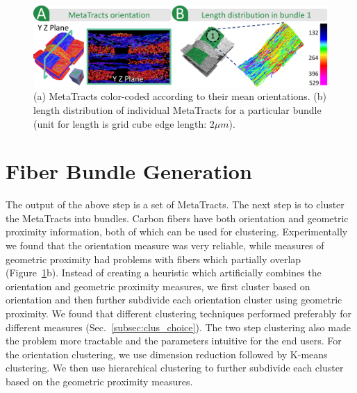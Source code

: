 

\begin{figure}[tb]
\centering
	\includegraphics[width=\linewidth]{images_pvis/figure5.pdf}
	\caption{(a) MetaTracts color-coded according to their mean orientations. (b) length distribution of individual MetaTracts for a particular bundle (unit for length is grid cube edge length:  $2\mu m$).}
	\label{fig:length_distribution}
\end{figure}


\section {Fiber Bundle Generation}
\label{subsec:fiber-bundles}

The output of the above step is a set of MetaTracts. The next step is to cluster the MetaTracts into bundles. 
Carbon fibers have both orientation and geometric proximity information, both of which can be used for clustering. Experimentally we found that the orientation measure was very reliable, while measures of geometric proximity had problems with fibers which partially overlap (Figure~\ref{fig:length_distribution}b).  
Instead of creating a heuristic which artificially combines the orientation and geometric proximity measures, we first cluster based on orientation and then further subdivide each orientation cluster using geometric proximity.
We found that different clustering techniques performed preferably for different measures (Sec.~\ref{subsec:clus_choice}).  The two step clustering also made the problem more tractable and  the parameters intuitive for the end users. For the orientation clustering, we use dimension reduction followed by K-means clustering. We then use hierarchical clustering to further subdivide each cluster based on the geometric proximity measures. 


